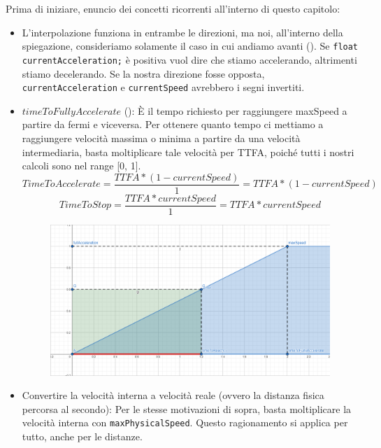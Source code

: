 \documentclass[main.tex]{subfiles}
\begin{document}
Prima di iniziare, enuncio dei concetti ricorrenti all'interno di questo capitolo:
\begin{itemize}
    \item L'interpolazione funziona in entrambe le direzioni, ma noi, all'interno della spiegazione, consideriamo solamente il caso in cui andiamo avanti (). Se \lstinline{float currentAcceleration;} è positiva vuol dire che stiamo accelerando, altrimenti stiamo decelerando. Se la nostra direzione fosse opposta, \lstinline{currentAcceleration} e \lstinline{currentSpeed} avrebbero i segni invertiti.
    \item $timeToFullyAccelerate$ (): È il tempo richiesto per raggiungere maxSpeed a partire da fermi e viceversa. Per ottenere quanto tempo ci mettiamo a raggiungere velocità massima o minima a partire da una velocità intermediaria, basta moltiplicare tale velocità per TTFA, poiché tutti i nostri calcoli sono nel range [0, 1].
    \[TimeToAccelerate = \frac{TTFA * (1 - currentSpeed)}{1} = TTFA * (1 - currentSpeed)\]
    \[TimeToStop = \frac{TTFA * currentSpeed}{1} = TTFA * currentSpeed\]
    \begin{figure}[H]
        \centering
        \includegraphics[width=.65\linewidth]{img/interpolazione/timeToFullyAccelerate.png}
        \label{fig:4_timeToFullyAccelerate}
    \end{figure}
    \item Convertire la velocità interna a velocità reale (ovvero la distanza fisica percorsa al secondo): Per le stesse motivazioni di sopra, basta moltiplicare la velocità interna con \lstinline{maxPhysicalSpeed}. Questo ragionamento si applica per tutto, anche per le distanze.
\end{itemize}
\end{document}

